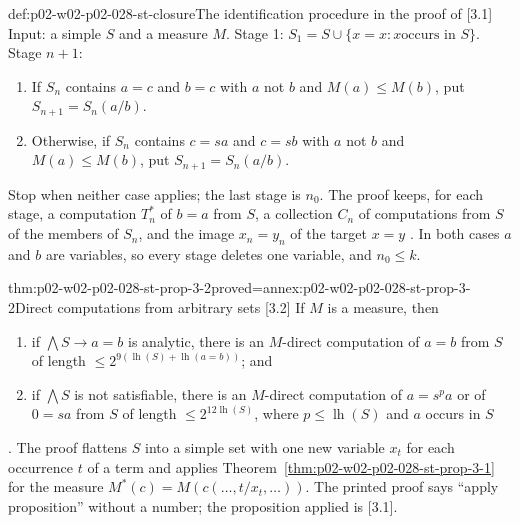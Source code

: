 \begin{hbmethod}{def:p02-w02-p02-028-st-closure}{The identification procedure in the proof of [3.1]}
Input: a simple \(S\) and a measure \(M\).  Stage 1: \(S_1=S\cup\{x=x:x\text{
occurs in }S\}\).  Stage \(n+1\):
\begin{enumerate}
  \item[Case 1.] If \(S_n\) contains \(a=c\) and \(b=c\) with \(a\) not
        \(b\) and \(M(a)\leq M(b)\), put \(S_{n+1}=S_n(a/b)\).
  \item[Case 2.] Otherwise, if \(S_n\) contains \(c=sa\) and \(c=sb\) with
        \(a\) not \(b\) and \(M(a)\leq M(b)\), put \(S_{n+1}=S_n(a/b)\).
\end{enumerate}
Stop when neither case applies; the last stage is \(n_0\).  The proof keeps,
for each stage, a computation \(T^*_n\) of \(b=a\) from \(S\), a collection
\(C_n\) of computations from \(S\) of the members of \(S_n\), and the image
\(x_n=y_n\) of the target \(x=y\) \cite[\S3.1, pp.~904--905]{Statman1977}.
In both cases \(a\) and \(b\) are variables, so every stage deletes one
variable, and \(n_0\leq k\).
\end{hbmethod}

\begin{hbtheorem}{thm:p02-w02-p02-028-st-prop-3-2}{proved=annex:p02-w02-p02-028-st-prop-3-2}{Direct computations from arbitrary sets [3.2]}
If \(M\) is a measure, then
\begin{enumerate}
  \item[(i)] if \(\bigwedge S\to a=b\) is analytic, there is an \(M\)-direct
        computation of \(a=b\) from \(S\) of length
        \(\leq2^{9(\operatorname{lh}(S)+\operatorname{lh}(a=b))}\); and
  \item[(ii)] if \(\bigwedge S\) is not satisfiable, there is an
        \(M\)-direct computation of \(a=s^pa\) or of \(0=sa\) from \(S\) of
        length \(\leq2^{12\operatorname{lh}(S)}\), where
        \(p\leq\operatorname{lh}(S)\) and \(a\) occurs in \(S\)
\end{enumerate}
\cite[\S3.2, pp.~906--907]{Statman1977}.  The proof flattens \(S\) into a
simple set with one new variable \(x_t\) for each occurrence \(t\) of a term
and applies Theorem~\ref{thm:p02-w02-p02-028-st-prop-3-1} for the measure
\(M^*(c)=M(c(\ldots,t/x_t,\ldots))\).  The printed proof says ``apply
proposition'' without a number; the proposition applied is [3.1].
\end{hbtheorem}

